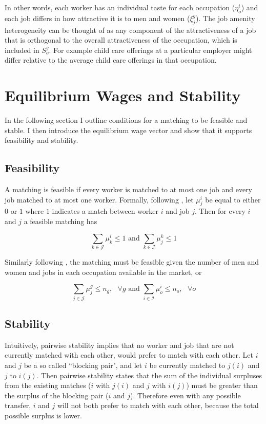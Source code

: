 \documentclass[12pt]{article}
\begin{document}
In other words, each worker has an individual taste for each occupation ($\eta^i_o$) and each job differs in how attractive it is to men and women ($\xi^g_j$). The job amenity heterogeneity can be thought of as any component of the attractiveness of a job that is orthogonal to the overall attractiveness of the occupation, which is included in $S^g_o$. For example child care offerings at a particular employer might differ relative to the average child care offerings in that occupation.


\section{Equilibrium Wages and Stability} \label{equilibrium}
In the following section I outline conditions for a matching to be feasible and stable. I then introduce the equilibrium wage vector and show that it supports feasibility and stability.

\subsection{Feasibility}
A matching is feasible if every worker is matched to at most one job and every job matched to at most one worker. Formally, following , let $\mu^i_j$ be equal to either $0$ or $1$ where $1$ indicates a match between worker $i$ and job $j$. Then for every $i$ and $j$ a feasible matching has

$$ \sum_{k \in \mathcal{J}} \mu^i_k \leq 1 \text{ and }  \sum_{k \in \mathcal{I}} \mu^k_j \leq 1$$

Similarly following , the matching must be feasible given the number of men and women and jobs in each occupation available in the market, or

$$ \sum_{j \in \mathcal{J}} \mu^g_j \leq n_g, \text{ } \forall g \text{ and }  \sum_{i \in \mathcal{I}} \mu^i_o \leq n_o, \text{ } \forall o$$

\subsection{Stability}

Intuitively, pairwise stability implies that no worker and job that are not currently matched with each other, would prefer to match with each other. Let $i$ and $j$ be a so called ``blocking pair", and let $i$ be currently matched to $j(i)$ and $j$ to $i(j)$. Then pairwise stability states that the sum of the individual surpluses from the existing matches ($i$ with $j(i)$ and $j$ with $i(j)$) must be greater than the surplus of the blocking pair ($i$ and $j$). Therefore even with any possible transfer, $i$ and $j$ will not both prefer to match with each other, because the total possible surplus is lower.
\end{document}
